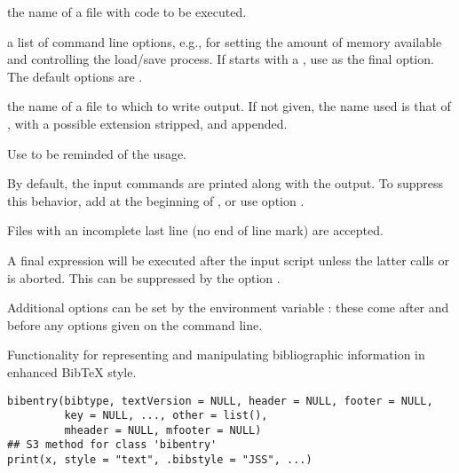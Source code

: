 %
\begin{Arguments}
\begin{ldescription}
\item[\code{infile}] the name of a file with \R{} code to be executed.
\item[\code{options}] a list of \R{} command line options, e.g., for setting the
amount of memory available and controlling the load/save process.
If  starts with a \samp{-}, use \option{--} as the final
option.  The default options are .
\item[\code{outfile}] the name of a file to which to write output.  If not
given, the name used is that of , with a possible
 extension stripped, and  appended.
\end{ldescription}
\end{Arguments}
%
\begin{Details}\relax
Use  to be reminded of the usage.

By default, the input commands are printed along with the output.  To
suppress this behavior, add  at the
beginning of , or use option .

Files with an incomplete last line (no end of line mark) are
accepted.

A final expression  will be executed after the input
script unless the latter calls  or is aborted.
This can be suppressed by the option .

Additional options can be set by the environment variable
: these come after 
and before any options given on the command line.
\end{Details}
%
\begin{Description}\relax
Functionality for representing and manipulating bibliographic
information in enhanced BibTeX style.
\end{Description}
%
\begin{Usage}
\begin{verbatim}
bibentry(bibtype, textVersion = NULL, header = NULL, footer = NULL,
         key = NULL, ..., other = list(),
         mheader = NULL, mfooter = NULL)
## S3 method for class 'bibentry'
print(x, style = "text", .bibstyle = "JSS", ...)
\end{verbatim}
\end{Usage}
